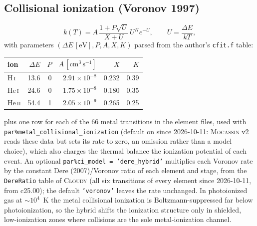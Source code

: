\documentclass[english,a4paper]{my_memo}
\newcommand{\code}[1]{\texttt{#1}}
\newcommand{\cmc}{\mathrm{cm^{3}\,s^{-1}}}
\begin{document}
\subsection{Collisional ionization (Voronov 1997)}
\begin{equation}
  k(T) = A\,\frac{1 + P\sqrt{U}}{X + U}\,U^{K} e^{-U},
  \qquad U = \frac{\Delta E}{kT},
\end{equation}
with parameters $(\Delta E\,[\mathrm{eV}], P, A, X, K)$ parsed from the
author's \code{cfit.f} table:
\begin{center}\small
\begin{tabular}{lrrrrr}
\toprule
ion & $\Delta E$ & $P$ & $A\,[\cmc]$ & $X$ & $K$ \\
\midrule
H\,\textsc{i}   & 13.6 & 0 & $2.91{\times}10^{-8}$ & 0.232 & 0.39 \\
He\,\textsc{i}  & 24.6 & 0 & $1.75{\times}10^{-8}$ & 0.180 & 0.35 \\
He\,\textsc{ii} & 54.4 & 1 & $2.05{\times}10^{-9}$ & 0.265 & 0.25 \\
\bottomrule
\end{tabular}
\end{center}
plus one row for each of the 66 metal transitions in the element files,
used with \code{par\%metal\_collisional\_ionization} (default on since
2026-10-11: \textsc{Mocassin} v2 reads these data but sets its rate to
zero, an omission rather than a model choice), which also charges the
thermal balance the ionization potential of each event.  An optional
\code{par\%ci\_model = 'dere\_hybrid'} multiplies each Voronov rate by
the constant Dere (2007)/Voronov ratio of each element and stage, from
the \code{DereRatio} table of \textsc{Cloudy} (all six transitions of every
element since 2026-10-11, from c25.00); the default \code{'voronov'}
leaves the rate unchanged.  In photoionized gas at $\sim$$10^4$~K the
metal collisional ionization is Boltzmann-suppressed far below
photoionization, so the hybrid shifts the ionization structure only in
shielded, low-ionization zones where collisions are the sole
metal-ionization channel.
\end{document}
